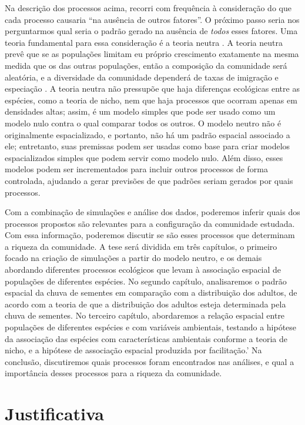 \documentclass[twoside,12pt,a4paper]{report}
\begin{document}
Na descrição dos processos acima, recorri com frequência à consideração do que cada processo
causaria ``na ausência de outros fatores''. O próximo passo seria nos perguntarmos qual seria
o padrão gerado na ausência de {\em todos} esses fatores. Uma teoria fundamental para essa
consideração é a teoria neutra \citep{Hubbell1979}.
A teoria neutra prevê que se as populações limitam eu
próprio crescimento exatamente na mesma medida que os das outras populações, então a
composição da comunidade será aleatória, e a diversidade da comunidade dependerá de taxas de
imigração e especiação \citep{Hubbell2001}. A teoria neutra não pressupõe que haja diferenças ecológicas entre
as espécies, como a teoria de nicho, nem que haja processos que ocorram apenas em densidades
altas; assim, é um modelo simples que pode ser usado como um modelo nulo contra o qual comparar
todos os outros. O modelo neutro não é originalmente espacializado, e portanto, não há
um padrão espacial associado a ele; entretanto, suas premissas podem ser usadas como base para
criar modelos espacializados simples que podem servir como modelo nulo. Além disso, esses
modelos podem ser incrementados para incluir outros processos de forma controlada, ajudando a
gerar previsões de que padrões seriam gerados por quais processos.

Com a combinação de simulações e análise dos dados, poderemos inferir quais dos processos
propostos são relevantes para a configuração da comunidade estudada. Com essa informação,
poderemos discutir se são esses processos que determinam a riqueza da comunidade.
A tese será dividida em três capítulos, o primeiro focado na criação de simulações a partir
do modelo neutro, e os demais abordando diferentes processos ecológicos que levam à
associação espacial de populações de diferentes espécies. No segundo capítulo, analisaremos o
padrão espacial da chuva de sementes em comparação com a distribuição dos adultos, de acordo com a
teoria de que a distribuição dos adultos esteja determinada pela chuva de sementes. No
terceiro
capítulo, abordaremos a relação espacial entre populações de diferentes espécies e com variáveis
ambientais, testando a hipótese da associação das espécies com características ambientais conforme a
teoria de nicho, e a hipótese de associação espacial produzida por facilitação.'
Na conclusão, discutiremos quais processos foram encontrados nas análises, e qual a
importância desses processos para a riqueza da comunidade.


\section{Justificativa}
\end{document}
